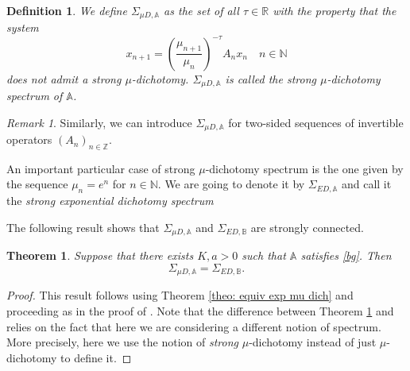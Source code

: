 \documentclass[reqno, a4paper, 10pt]{amsart}
\theoremstyle{plain}
\numberwithin{equation}{section}
\newtheorem{theorem}{Theorem}
\newtheorem{definition}{Definition}
\theoremstyle{remark}
\newtheorem{remark}{Remark}
\def\N{\mathbb{N}}
\def\R{\mathbb{R}}
\def\Z{\mathbb{Z}}
\begin{document}
\begin{definition} \label{def: mu spect}
We define $\Sigma_{\mu D, \mathbb A}$ as the set of all $\tau \in \R$ with the property that the system
\begin{equation*}\label{lin1}
    x_{n+1}=\left (\frac{\mu_{n+1}}{\mu_n}\right )^{-\tau }A_n x_n   \quad n\in \N
\end{equation*}
does not admit a strong $\mu$-dichotomy. $\Sigma_{\mu D, \mathbb A}$ is called the \emph{strong $\mu$-dichotomy spectrum} of $\mathbb A$.
\end{definition}

\begin{remark}\label{aaa}
Similarly, we can introduce $\Sigma_{\mu D, \mathbb A}$ for two-sided sequences of invertible operators $(A_n)_{n\in \Z}$.
\end{remark}


An important particular case of strong $\mu$-dichotomy spectrum is the one given by the sequence $\mu_n=e^n$ for $n\in \N$. We are going to denote it by $\Sigma_{ED, \mathbb A}$ and call it the \emph{strong exponential dichotomy spectrum}




The following result shows that $\Sigma_{\mu D, \mathbb A}$ and $\Sigma_{ED, \mathbb B}$ are strongly connected.
\begin{theorem}\label{theo: DS-equal spect}
 Suppose that there exists $K,a>0$ such that $\mathbb A$ satisfies \eqref{bg}.
 Then
\[
\Sigma_{\mu D, \mathbb A}=\Sigma_{ED, \mathbb B}.
\]
\end{theorem}
\begin{proof}
    This result follows using Theorem \ref{theo: equiv exp mu dich} and proceeding as in the proof of \cite[Theorem 4.1]{DS}. Note that the difference between Theorem \ref{theo: DS-equal spect} and \cite[Theorem 4.1]{DS} relies on the fact that here we are considering a different notion of spectrum. More precisely, here we use the notion of \emph{strong} $\mu$-dichotomy instead of just $\mu$-dichotomy to define it.
\end{proof}
\end{document}
